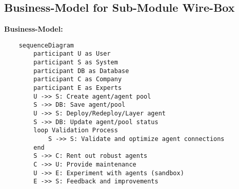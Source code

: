 \documentclass[11pt, a4paper]{article}
\begin{document}
    \begin{gitbox}
        \section*{Business-Model for Sub-Module Wire-Box}
        \textbf{Business-Model:}

        \begin{verbatim}
    sequenceDiagram
        participant U as User
        participant S as System
        participant DB as Database
        participant C as Company
        participant E as Experts
        U ->> S: Create agent/agent pool
        S ->> DB: Save agent/pool
        U ->> S: Deploy/Redeploy/Layer agent
        S ->> DB: Update agent/pool status
        loop Validation Process
            S ->> S: Validate and optimize agent connections
        end
        S ->> C: Rent out robust agents
        C ->> U: Provide maintenance
        U ->> E: Experiment with agents (sandbox)
        E ->> S: Feedback and improvements
        \end{verbatim}


\end{gitbox}
\end{document}
